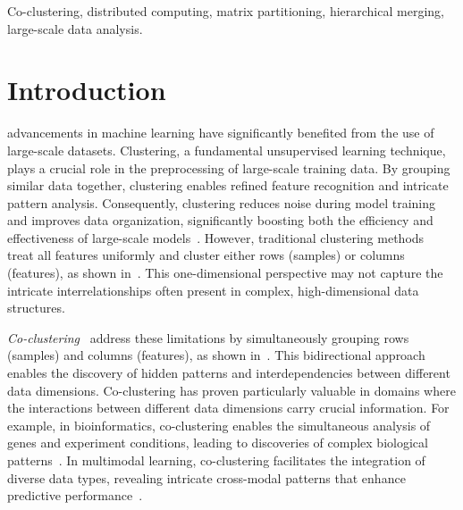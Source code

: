 \documentclass[journal]{IEEEtran}
\renewcommand{\cite}[1]{~\autocite{#1}}
\begin{document}
\begin{IEEEkeywords}
    Co-clustering, distributed computing, matrix partitioning, hierarchical merging, large-scale data analysis.
\end{IEEEkeywords}


\section{Introduction}
 advancements in machine learning have significantly benefited from the use of large-scale datasets. Clustering, a fundamental unsupervised learning technique, plays a crucial role in the preprocessing of large-scale training data. By grouping similar data together, clustering enables refined feature recognition and intricate pattern analysis. Consequently, clustering reduces noise during model training and improves data organization, significantly boosting both the efficiency and effectiveness of large-scale models\cite{raskutti2002CombiningClusteringCotraining, li2014ClusteringguidedSparseStructural, ghimatgar2018ImprovedFeatureSelection}. However, traditional clustering methods\cite{lloyd1982LeastSquaresQuantization, arthur2007KmeansAdvantagesCareful, mclachlan1987MixtureModelsInference} treat all features uniformly and cluster either rows (samples) or columns (features), as shown in~. This one-dimensional perspective may not capture the intricate interrelationships often present in complex, high-dimensional data structures.

\textit{Co-clustering}\cite{kluger2003SpectralBiclusteringMicroarray, yan2017CoclusteringMultidimensionalBig,wu2024AccurateDetectionEllipses} address these limitations by simultaneously grouping rows (samples) and columns (features), as shown in~. This bidirectional approach enables the discovery of hidden patterns and interdependencies between different data dimensions. Co-clustering has proven particularly valuable in domains where the interactions between different data dimensions carry crucial information. For example, in bioinformatics, co-clustering enables the simultaneous analysis of genes and experiment conditions, leading to discoveries of complex biological patterns\cite{higham2007SpectralClusteringIts, kluger2003SpectralBiclusteringMicroarray, madeira2004BiclusteringAlgorithmsBiological, zhao2012BiclusteringAnalysisPattern, golchev2015BiclusteringAnalysisGene}.
In multimodal learning, co-clustering facilitates the integration of diverse data types, revealing intricate cross-modal patterns that enhance predictive performance\cite{mu2022LearningHybridBehavior}.
\end{document}
